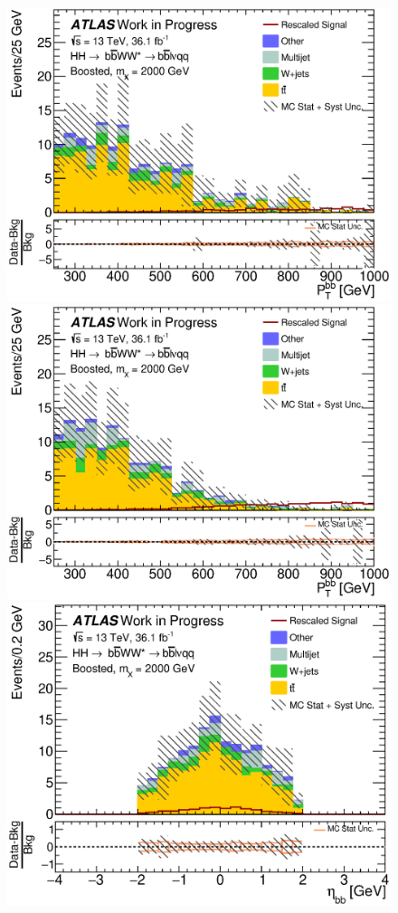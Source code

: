 \begin{figure}[h]
\begin{center}
\includegraphics[scale=0.33]{figures/kinplots/C_2tag_SR_elec_presel_met50_HbbPt}
\includegraphics[scale=0.33]{figures/kinplots/C_2tag_SR_muon_presel_met50_HbbPt}\\
\includegraphics[scale=0.33]{figures/kinplots/C_2tag_SR_elec_presel_met50_HbbEta}

\end{center}
\end{figure}
